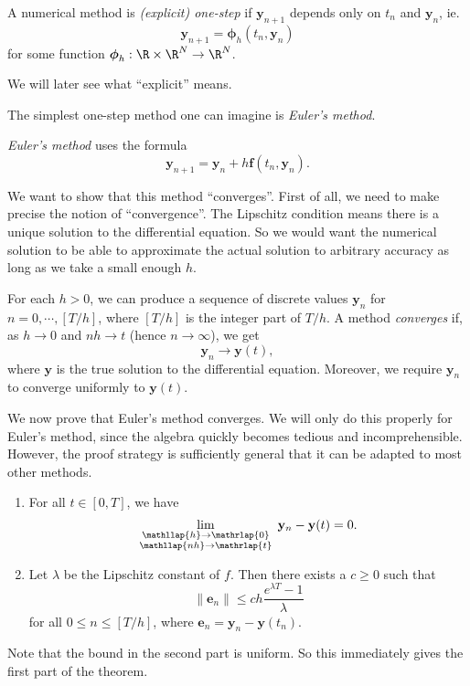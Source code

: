 \documentclass[a4paper]{article}
\begin{document}
\begin{defi}
  A numerical method is \emph{(explicit) one-step} if $\mathbf{y}_{n + 1}$ depends only on $t_n$ and $\mathbf{y}_n$, ie.
  \[
    \mathbf{y}_{n + 1} = \boldsymbol\phi_h(t_n, \mathbf{y}_n)
  \]
  for some function $\boldsymbol\phi_h: \R \times \R^N \to \R^N$.
\end{defi}
We will later see what ``explicit'' means.

The simplest one-step method one can imagine is \emph{Euler's method}.
\begin{defi}
  \emph{Euler's method} uses the formula
  \[
    \mathbf{y}_{n + 1} = \mathbf{y}_n + h\mathbf{f}(t_n, \mathbf{y}_n).
  \]
\end{defi}
We want to show that this method ``converges''. First of all, we need to make precise the notion of ``convergence''. The Lipschitz condition means there is a unique solution to the differential equation. So we would want the numerical solution to be able to approximate the actual solution to arbitrary accuracy as long as we take a small enough $h$.

\begin{defi}
  For each $h > 0$, we can produce a sequence of discrete values $\mathbf{y}_n$ for $n = 0, \cdots, [T/h]$, where $[T/h]$ is the integer part of $T/h$. A method \emph{converges} if, as $h \to 0$ and $nh \to t$ (hence $n \to \infty$), we get
  \[
    \mathbf{y}_n \to \mathbf{y}(t),
  \]
  where $\mathbf{y}$ is the true solution to the differential equation. Moreover, we require $\mathbf{y}_n$ to converge uniformly to $\mathbf{y}(t)$.
\end{defi}

We now prove that Euler's method converges. We will only do this properly for Euler's method, since the algebra quickly becomes tedious and incomprehensible. However, the proof strategy is sufficiently general that it can be adapted to most other methods.

\begin{thm}\leavevmode
  \begin{enumerate}
    \item For all $t \in [0, T]$, we have
      \[
        \lim_{\substack{\mathllap{h} \to \mathrlap{0}\\\mathllap{nh}\to\mathrlap{t}}}\; \mathbf{y}_n - \mathbf{y}(t) = 0.
      \]
    \item Let $\lambda$ be the Lipschitz constant of $f$. Then there exists a $c \geq 0$ such that
      \[
        \|\mathbf{e}_n\| \leq ch \frac{e^{\lambda T} - 1}{\lambda}
      \]
      for all $0 \leq n \leq [T/h]$, where $\mathbf{e}_n = \mathbf{y}_n - \mathbf{y}(t_n)$.
  \end{enumerate}
\end{thm}
Note that the bound in the second part is uniform. So this immediately gives the first part of the theorem.
\end{document}
